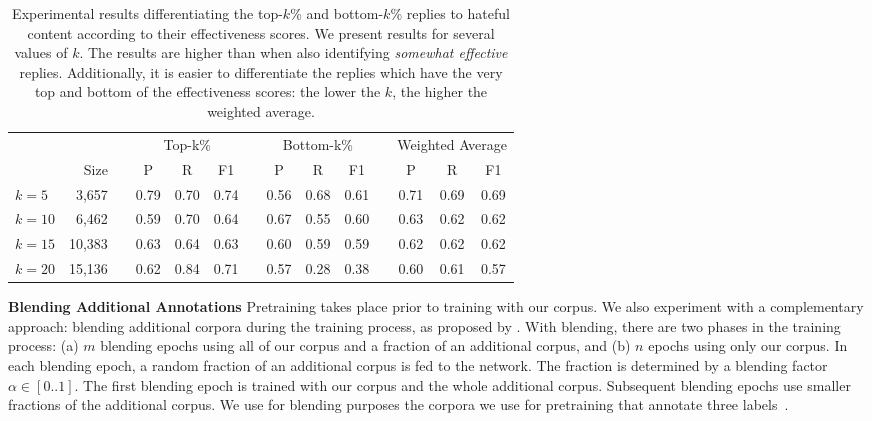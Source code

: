 \documentclass[11pt]{article}
\begin{document}
\begin{table*}
	\small
	\centering	
	\begin{tabular}{lrl  cccc cccc ccc}
		\toprule
		\multicolumn{3}{c}{} & \multicolumn{3}{c}{Top-k\%} && \multicolumn{3}{c}{Bottom-k\%} && \multicolumn{3}{c}{Weighted Average}  \\ \cmidrule(lr){4-6} \cmidrule(lr){8-10} \cmidrule(lr){12-14} 
		& Size && P & R & F1 && P & R & F1 && P & R & F1  \\ \midrule
		$\mathit{k}=5$  &  3,657 && 0.79 & 0.70 & 0.74 && 0.56 & 0.68 & 0.61 && 0.71 & 0.69 & 0.69 \\
		$\mathit{k}=10$ &  6,462 && 0.59 & 0.70 & 0.64 && 0.67 & 0.55 & 0.60 && 0.63 & 0.62 & 0.62 \\
		$\mathit{k}=15$ & 10,383 && 0.63 & 0.64 & 0.63 && 0.60 & 0.59 & 0.59 && 0.62 & 0.62 & 0.62 \\
		$\mathit{k}=20$ & 15,136 && 0.62 & 0.84 & 0.71 && 0.57 & 0.28 & 0.38 && 0.60 & 0.61 & 0.57 \\ \bottomrule
		
	\end{tabular}
	\caption{Experimental results differentiating the top-$k$\% and bottom-$k$\% replies to hateful content according to their effectiveness scores.
		We present results for several values of $k$.
		The results are higher than when also identifying \emph{somewhat effective} replies.
		Additionally, it is easier to differentiate the replies which have the very top and bottom of the effectiveness scores: the lower the $k$, the higher the weighted average.
	}
	\label{t:model-optimalk}
\end{table*}

\noindent
\textbf{Blending Additional Annotations}
Pretraining takes place prior to training with our corpus.
We also experiment with a complementary approach: blending additional corpora during the training process, as proposed by \citet{shnarch-etal-2018-will}.
With blending, there are two phases in the training process: 
(a) $\mathit{m}$ blending epochs using all of our corpus and a fraction of an additional corpus,
and
(b) $\mathit{n}$ epochs using only our corpus. 
In each blending epoch, a random fraction of an additional corpus is fed to the network.
The fraction is determined by a blending factor $\alpha \in [0..1]$. 
The first blending epoch is trained with our corpus and the whole additional corpus.
Subsequent blending epochs use smaller fractions of the additional corpus.
We use for blending purposes the corpora we use for pretraining that annotate three labels~\cite{rosenthal-etal-2017-semeval,pougubiyong2021debagreement,yu-etal-2022-hate}.
\end{document}
